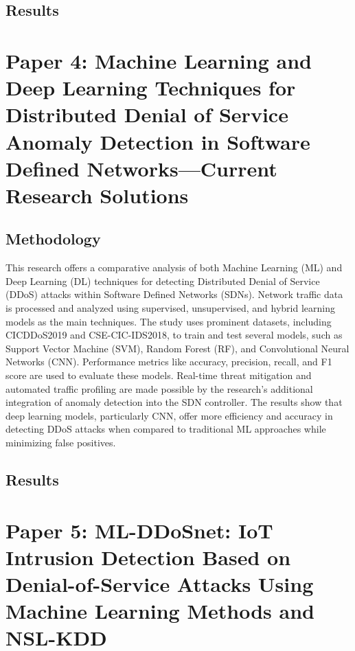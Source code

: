 \documentclass[a4paper, 12pt]{article}
\begin{document}
\subsection{Results}

\section{Paper 4: Machine Learning and Deep Learning Techniques for Distributed Denial of Service Anomaly Detection in Software Defined Networks—Current Research Solutions}

\subsection{Methodology}
This research offers a comparative analysis of both Machine Learning (ML) and Deep Learning (DL) techniques for detecting Distributed Denial of Service (DDoS) attacks within Software Defined Networks (SDNs). Network traffic data is processed and analyzed using supervised, unsupervised, and hybrid learning models as the main techniques. The study uses prominent datasets, including CICDDoS2019 and CSE-CIC-IDS2018, to train and test several models, such as Support Vector Machine (SVM), Random Forest (RF), and Convolutional Neural Networks (CNN). Performance metrics like accuracy, precision, recall, and F1 score are used to evaluate these models. Real-time threat mitigation and automated traffic profiling are made possible by the research's additional integration of anomaly detection into the SDN controller. The results show that deep learning models, particularly CNN, offer more efficiency and accuracy in detecting DDoS attacks when compared to traditional ML approaches while minimizing false positives. 

\subsection{Results}

\section{Paper 5: ML-DDoSnet: IoT Intrusion Detection Based on Denial-of-Service Attacks Using Machine Learning Methods and NSL-KDD}
\end{document}
